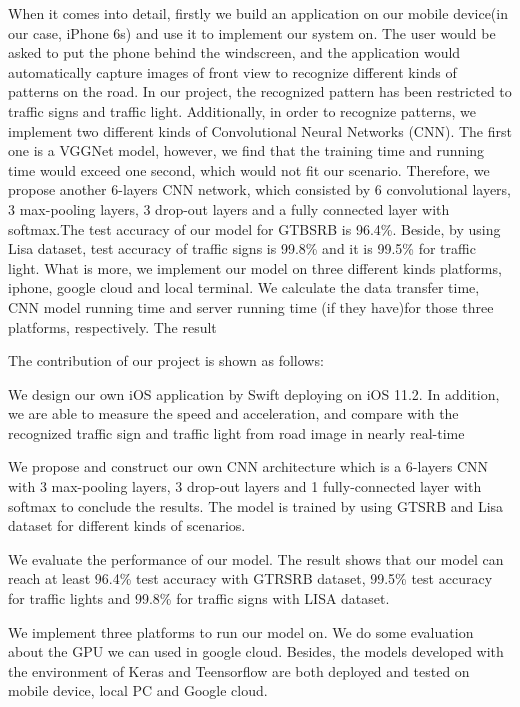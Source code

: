 \documentclass[conference]{IEEEtran}
\begin{document}
When it comes into detail, firstly we build an application on our mobile device(in our case, iPhone 6s) and use it to implement our system on. The user would be asked to put the phone behind the windscreen, and the application would automatically capture images of front view to recognize different kinds of patterns on the road. In our project, the recognized pattern has been restricted to traffic signs and traffic light. Additionally, in order to recognize patterns, we implement two different kinds of Convolutional Neural Networks (CNN). The first one is a VGGNet model, however, we find that the training time and running time would exceed one second, which would not fit our scenario. Therefore, we propose another 6-layers CNN network, which consisted by 6 convolutional layers, 3 max-pooling layers, 3 drop-out layers and a fully connected layer with softmax.The test accuracy of our model for GTBSRB is 96.4\%. Beside, by using Lisa dataset, test accuracy of traffic signs is 99.8\% and it is 99.5\% for traffic light. What is more, we implement our model on three different kinds platforms, iphone, google cloud and local terminal.  We calculate the data transfer time, CNN model running time and server running time (if they have)for those three platforms, respectively. The result


The contribution of our project is shown as follows: 

\textbullet We design our own iOS application by Swift deploying on iOS 11.2. In addition, we are able to measure the speed and acceleration, and compare with the recognized traffic sign and traffic light from road image in nearly real-time 

\textbullet We propose and construct our own CNN architecture which is a 6-layers CNN with 3 max-pooling layers, 3 drop-out layers and 1 fully-connected layer with softmax to conclude the results. The model is trained by using GTSRB and Lisa dataset for different kinds of scenarios.

\textbullet We evaluate the performance of our model. The result shows that our model can reach at least 96.4\% test accuracy with GTRSRB dataset, 99.5\% test accuracy for traffic lights and 99.8\% for traffic signs with LISA dataset.

\textbullet We implement three platforms to run our model on. We do some evaluation about the GPU we can used in google cloud. Besides, the models developed with the environment of Keras and Teensorflow are both deployed and tested on mobile device, local PC and Google cloud. 
\end{document}
